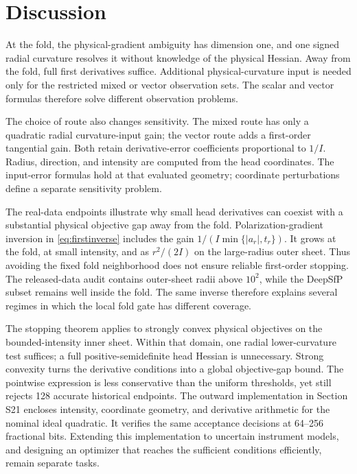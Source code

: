 



\section{Discussion}
At the fold, the physical-gradient ambiguity has dimension one, and one signed radial curvature resolves it without knowledge of the physical Hessian. Away from the fold, full first derivatives suffice. Additional physical-curvature input is needed only for the restricted mixed or vector observation sets. The scalar and vector formulas therefore solve different observation problems.

The choice of route also changes sensitivity. The mixed route has only a quadratic radial curvature-input gain; the vector route adds a first-order tangential gain. Both retain derivative-error coefficients proportional to $1/I$. Radius, direction, and intensity are computed from the head coordinates. The input-error formulas hold at that evaluated geometry; coordinate perturbations define a separate sensitivity problem.

The real-data endpoints illustrate why small head derivatives can coexist with a substantial physical objective gap away from the fold. Polarization-gradient inversion in \eqref{eq:firstinverse} includes the gain $1/(I\min\{|a_r|,t_r\})$. It grows at the fold, at small intensity, and as $r^2/(2I)$ on the large-radius outer sheet. Thus avoiding the fixed fold neighborhood does not ensure reliable first-order stopping. The released-data audit contains outer-sheet radii above $10^2$, while the DeepSfP subset remains well inside the fold. The same inverse therefore explains several regimes in which the local fold gate has different coverage.

The stopping theorem applies to strongly convex physical objectives on the bounded-intensity inner sheet. Within that domain, one radial lower-curvature test suffices; a full positive-semidefinite head Hessian is unnecessary. Strong convexity turns the derivative conditions into a global objective-gap bound. The pointwise expression is less conservative than the uniform thresholds, yet still rejects 128 accurate historical endpoints. The outward implementation in Section S21 encloses intensity, coordinate geometry, and derivative arithmetic for the nominal ideal quadratic. It verifies the same acceptance decisions at 64--256 fractional bits. Extending this implementation to uncertain instrument models, and designing an optimizer that reaches the sufficient conditions efficiently, remain separate tasks.

